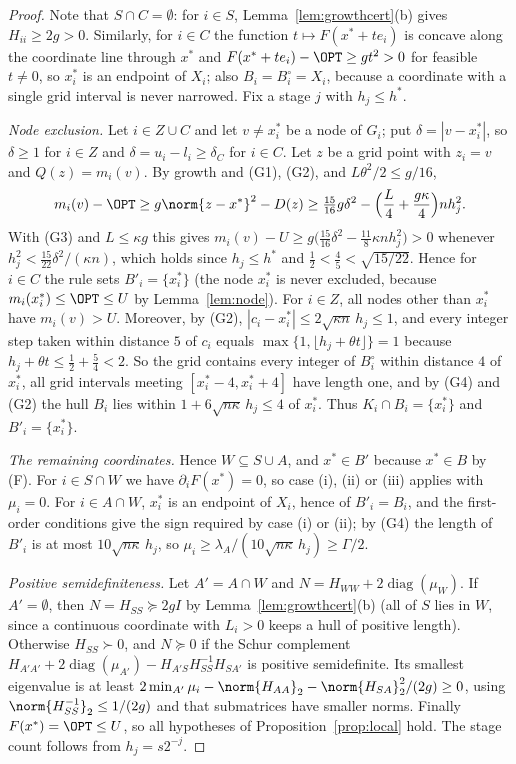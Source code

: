 \begin{proof}
Note that $S\cap C=\emptyset$: for $i\in S$, Lemma~\ref{lem:growthcert}(b)
gives $H_{ii}\ge2g>0$. Similarly, for $i\in C$ the function
$t\mapsto F(x^*+te_i)$ is concave along the coordinate line through $x^*$
and $F(x^*+te_i)-\OPT\ge gt^2>0$ for feasible $t\ne0$, so $x^*_i$ is an
endpoint of $X_i$; also $B_i=B^\circ_i=X_i$, because a coordinate with a
single grid interval is never narrowed. Fix a stage $j$ with $h_j\le h^*$.

\emph{Node exclusion.} Let $i\in Z\cup C$ and let $v\ne x^*_i$ be a node of
$G_i$; put $\delta=|v-x^*_i|$, so $\delta\ge1$ for $i\in Z$ and
$\delta=u_i-l_i\ge\delta_C$ for $i\in C$. Let $z$ be a grid point with
$z_i=v$ and $Q(z)=m_i(v)$. By growth and (G1), (G2), and
$L\theta^2/2\le g/16$,
\[
m_i(v)-\OPT\ge g\norm{z-x^*}^2-D(z)\ge\tfrac{15}{16}g\delta^2
-\Bigl(\frac L4+\frac{g\kappa}4\Bigr)nh_j^2 .
\]
With (G3) and $L\le\kappa g$ this gives
$m_i(v)-U\ge g\bigl(\frac{15}{16}\delta^2-\frac{11}8\kappa nh_j^2\bigr)>0$
whenever $h_j^2<\frac{15}{22}\delta^2/(\kappa n)$, which holds since
$h_j\le h^*$ and $\frac12<\frac45<\sqrt{15/22}$. Hence for $i\in C$
the rule sets $B'_i=\{x^*_i\}$ (the node $x^*_i$ is never excluded, because
$m_i(x^*_i)\le\OPT\le U$ by Lemma~\ref{lem:node}). For $i\in Z$, all
nodes other than $x^*_i$ have $m_i(v)>U$. Moreover, by (G2),
$|c_i-x^*_i|\le2\sqrt{\kappa n}\,h_j\le1$, and every
integer step taken within distance $5$ of $c_i$ equals
$\max\{1,\lfloor h_j+\theta t\rfloor\}=1$ because
$h_j+\theta t\le\frac12+\frac54<2$. So the grid contains every integer of
$B^\circ_i$ within distance $4$ of $x^*_i$, all grid intervals meeting
$[x^*_i-4,x^*_i+4]$ have length one, and by (G4) and (G2) the hull $B_i$
lies within $1+6\sqrt{n\kappa}\,h_j\le4$ of $x^*_i$. Thus $K_i\cap B_i=\{x^*_i\}$
and $B'_i=\{x^*_i\}$.

\emph{The remaining coordinates.} Hence $W\subseteq S\cup A$, and
$x^*\in B'$ because $x^*\in B$ by (F). For $i\in S\cap W$ we have
$\partial_iF(x^*)=0$, so case (i), (ii) or (iii) applies with $\mu_i=0$. For
$i\in A\cap W$, $x^*_i$ is an endpoint of $X_i$, hence of $B'_i=B_i$, and
the first-order conditions give the sign required by case (i) or (ii); by
(G4) the length of $B'_i$ is at most $10\sqrt{n\kappa}\,h_j$, so
$\mu_i\ge\lambda_A/(10\sqrt{n\kappa}\,h_j)\ge\Gamma/2$.

\emph{Positive semidefiniteness.} Let $A'=A\cap W$ and
$N=H_{WW}+2\operatorname{diag}(\mu_W)$. If $A'=\emptyset$, then
$N=H_{SS}\succeq2gI$ by Lemma~\ref{lem:growthcert}(b) (all of $S$ lies in
$W$, since a continuous coordinate with $L_i>0$ keeps a hull of positive
length). Otherwise $H_{SS}\succ0$, and $N\succeq0$ if the Schur complement
$H_{A'A'}+2\operatorname{diag}(\mu_{A'})-H_{A'S}H_{SS}^{-1}H_{SA'}$ is
positive semidefinite. Its smallest eigenvalue is at least
$2\min_{A'}\mu_i-\norm{H_{AA}}_2-\norm{H_{SA}}_2^2/(2g)\ge0$, using
$\norm{H_{SS}^{-1}}_2\le1/(2g)$ and that submatrices have smaller norms.
Finally $F(x^*)=\OPT\le U$, so all hypotheses of
Proposition~\ref{prop:local} hold. The stage count follows from
$h_j=s2^{-j}$.
\end{proof}
